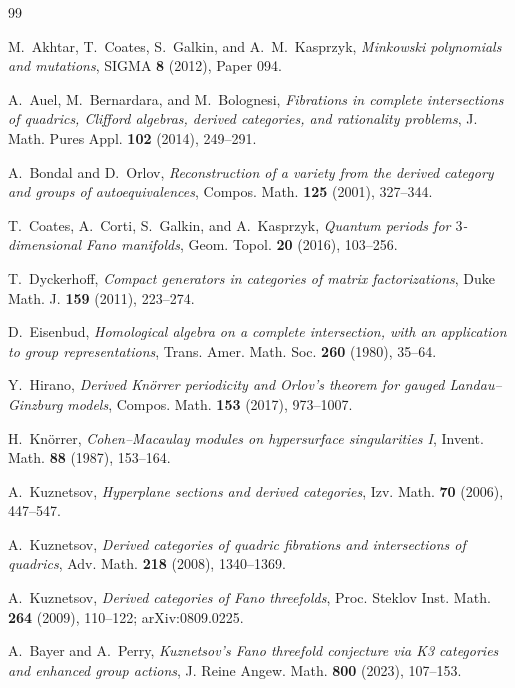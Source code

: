 \documentclass[11pt]{amsart}
\theoremstyle{definition}
\theoremstyle{remark}
\begin{document}
\begin{thebibliography}{99}

M.~Akhtar, T.~Coates, S.~Galkin, and A.~M.~Kasprzyk,
\emph{Minkowski polynomials and mutations},
SIGMA \textbf{8} (2012), Paper 094.

A.~Auel, M.~Bernardara, and M.~Bolognesi,
\emph{Fibrations in complete intersections of quadrics, Clifford algebras,
derived categories, and rationality problems},
J. Math. Pures Appl. \textbf{102} (2014), 249--291.

A.~Bondal and D.~Orlov,
\emph{Reconstruction of a variety from the derived category and groups of
autoequivalences},
Compos. Math. \textbf{125} (2001), 327--344.

T.~Coates, A.~Corti, S.~Galkin, and A.~Kasprzyk,
\emph{Quantum periods for $3$-dimensional Fano manifolds},
Geom. Topol. \textbf{20} (2016), 103--256.

T.~Dyckerhoff,
\emph{Compact generators in categories of matrix factorizations},
Duke Math. J. \textbf{159} (2011), 223--274.

D.~Eisenbud,
\emph{Homological algebra on a complete intersection, with an application to
group representations},
Trans. Amer. Math. Soc. \textbf{260} (1980), 35--64.

Y.~Hirano,
\emph{Derived Kn\"orrer periodicity and Orlov's theorem for gauged
Landau--Ginzburg models},
Compos. Math. \textbf{153} (2017), 973--1007.

H.~Kn\"orrer,
\emph{Cohen--Macaulay modules on hypersurface singularities I},
Invent. Math. \textbf{88} (1987), 153--164.

A.~Kuznetsov,
\emph{Hyperplane sections and derived categories},
Izv. Math. \textbf{70} (2006), 447--547.

A.~Kuznetsov,
\emph{Derived categories of quadric fibrations and intersections of quadrics},
Adv. Math. \textbf{218} (2008), 1340--1369.

A.~Kuznetsov,
\emph{Derived categories of Fano threefolds},
Proc. Steklov Inst. Math. \textbf{264} (2009), 110--122;
arXiv:0809.0225.

A.~Bayer and A.~Perry,
\emph{Kuznetsov's Fano threefold conjecture via K3 categories and enhanced
group actions},
J. Reine Angew. Math. \textbf{800} (2023), 107--153.


\end{thebibliography}
\end{document}
